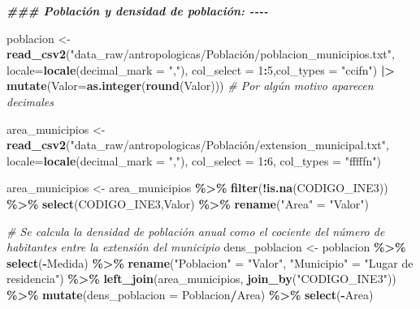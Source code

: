 \documentclass[12pt,a4paper,]{book}
\newenvironment{Shaded}{\begin{snugshade}}{\end{snugshade}}
\newcommand{\AttributeTok}[1]{\textcolor[rgb]{0.13,0.29,0.53}{#1}}
\newcommand{\CommentTok}[1]{\textcolor[rgb]{0.56,0.35,0.01}{\textit{#1}}}
\newcommand{\DecValTok}[1]{\textcolor[rgb]{0.00,0.00,0.81}{#1}}
\newcommand{\DocumentationTok}[1]{\textcolor[rgb]{0.56,0.35,0.01}{\textbf{\textit{#1}}}}
\newcommand{\FunctionTok}[1]{\textcolor[rgb]{0.13,0.29,0.53}{\textbf{#1}}}
\newcommand{\NormalTok}[1]{#1}
\newcommand{\OtherTok}[1]{\textcolor[rgb]{0.56,0.35,0.01}{#1}}
\newcommand{\SpecialCharTok}[1]{\textcolor[rgb]{0.81,0.36,0.00}{\textbf{#1}}}
\newcommand{\StringTok}[1]{\textcolor[rgb]{0.31,0.60,0.02}{#1}}
\numberwithin{dummy}{section}
\theoremstyle{ocrenumbox}
\theoremstyle{blacknumex}
\theoremstyle{blacknumbox}
\theoremstyle{ocrenum}
\theoremstyle{ocrenum}
\begin{document}
\begin{Shaded}
\begin{Highlighting}[]
  \DocumentationTok{\#\#\# Población y densidad de población: {-}{-}{-}{-}}
  
\NormalTok{  poblacion }\OtherTok{\textless{}{-}} \FunctionTok{read\_csv2}\NormalTok{(}\StringTok{"data\_raw/antropologicas/Población/poblacion\_municipios.txt"}\NormalTok{,}
                         \AttributeTok{locale=}\FunctionTok{locale}\NormalTok{(}\AttributeTok{decimal\_mark =} \StringTok{","}\NormalTok{),}
                         \AttributeTok{col\_select =} \DecValTok{1}\SpecialCharTok{:}\DecValTok{5}\NormalTok{,}\AttributeTok{col\_types =} \StringTok{"ccifn"}\NormalTok{) }\SpecialCharTok{|\textgreater{}} 
    \FunctionTok{mutate}\NormalTok{(}\AttributeTok{Valor=}\FunctionTok{as.integer}\NormalTok{(}\FunctionTok{round}\NormalTok{(Valor))) }\CommentTok{\# Por algún motivo aparecen decimales}
  
  
\NormalTok{  area\_municipios }\OtherTok{\textless{}{-}} \FunctionTok{read\_csv2}\NormalTok{(}\StringTok{"data\_raw/antropologicas/Población/extension\_municipal.txt"}\NormalTok{,}
                               \AttributeTok{locale=}\FunctionTok{locale}\NormalTok{(}\AttributeTok{decimal\_mark =} \StringTok{","}\NormalTok{),}
                               \AttributeTok{col\_select =} \DecValTok{1}\SpecialCharTok{:}\DecValTok{6}\NormalTok{, }\AttributeTok{col\_types =} \StringTok{"fffffn"}\NormalTok{)}

\NormalTok{  area\_municipios }\OtherTok{\textless{}{-}}\NormalTok{ area\_municipios }\SpecialCharTok{\%\textgreater{}\%} 
    \FunctionTok{filter}\NormalTok{(}\SpecialCharTok{!}\FunctionTok{is.na}\NormalTok{(CODIGO\_INE3)) }\SpecialCharTok{\%\textgreater{}\%} 
    \FunctionTok{select}\NormalTok{(CODIGO\_INE3,Valor) }\SpecialCharTok{\%\textgreater{}\%} 
    \FunctionTok{rename}\NormalTok{(}\StringTok{"Area"} \OtherTok{=} \StringTok{"Valor"}\NormalTok{)}
  
  \CommentTok{\# Se calcula la densidad de población anual como el cociente del número de habitantes entre la extensión del municipio}
\NormalTok{  dens\_poblacion }\OtherTok{\textless{}{-}}\NormalTok{ poblacion }\SpecialCharTok{\%\textgreater{}\%} 
    \FunctionTok{select}\NormalTok{(}\SpecialCharTok{{-}}\NormalTok{Medida) }\SpecialCharTok{\%\textgreater{}\%} 
    \FunctionTok{rename}\NormalTok{(}\StringTok{"Poblacion"} \OtherTok{=} \StringTok{"Valor"}\NormalTok{,}
           \StringTok{"Municipio"} \OtherTok{=} \StringTok{"Lugar de residencia"}\NormalTok{) }\SpecialCharTok{\%\textgreater{}\%} 
    \FunctionTok{left\_join}\NormalTok{(area\_municipios,}
              \FunctionTok{join\_by}\NormalTok{(}\StringTok{"CODIGO\_INE3"}\NormalTok{)) }\SpecialCharTok{\%\textgreater{}\%} 
    \FunctionTok{mutate}\NormalTok{(}\AttributeTok{dens\_poblacion =}\NormalTok{ Poblacion}\SpecialCharTok{/}\NormalTok{Area) }\SpecialCharTok{\%\textgreater{}\%} 
    \FunctionTok{select}\NormalTok{(}\SpecialCharTok{{-}}\NormalTok{Area)}
  

\end{Highlighting}
\end{Shaded}
\end{document}
